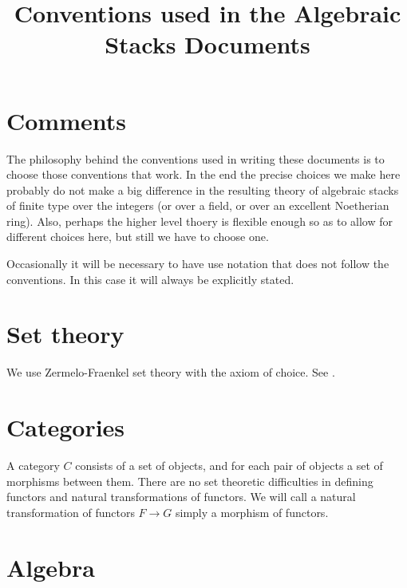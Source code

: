 \documentclass{amsart}
\theoremstyle{definition}
\theoremstyle{remark}
\numberwithin{equation}{subsection}
\begin{document}
\title{Conventions used in the Algebraic Stacks Documents}


\maketitle
\thispagestyle{fancy}

\tableofcontents

\section{Comments}
\label{section-comments}

\noindent
The philosophy behind the conventions used in writing these documents is
to choose those conventions that work. In the end the precise choices we 
make here probably do not make a big difference in the resulting theory 
of algebraic stacks of finite type over the integers (or over a field, 
or over an excellent Noetherian ring). Also, perhaps the higher level
thoery is flexible enough so as to allow for different choices here, but
still we have to choose one.

\smallskip\noindent
Occasionally it will be necessary to have use notation that does not follow 
the conventions. In this case it will always be explicitly stated.

\section{Set theory} 
\label{section-sets}

\noindent
We use Zermelo-Fraenkel set theory with the axiom of choice.
See \cite{Kunen}.

\section{Categories} 
\label{section-categories}

\noindent
A category $C$ consists of a set of objects, and for each pair of objects
a set of morphisms between them. There are no set theoretic difficulties
in defining functors and natural transformations of functors. We will call
a natural transformation of functors $F \to G$ simply a morphism of functors.

\section{Algebra}
\label{section-algebra}
\end{document}
